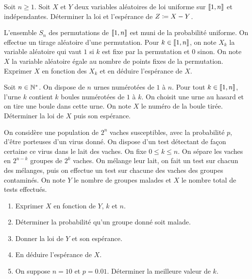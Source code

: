 \documentclass{magnolia}
\begin{document}


Soit $n \geq 1$. Soit $X$ et $Y$ deux variables aléatoires de loi uniforme sur $\left\llbracket 1,n\right\rrbracket$ et indépendantes.
Déterminer la loi et l'espérance de $Z\coloneqq X-Y$.

L'ensemble $S_n$ des permutations de $\left\llbracket 1,n\right\rrbracket$ est muni de la probabilité uniforme.
On effectue un tirage aléatoire d'une permutation. Pour $k \in \left\llbracket 1,n\right\rrbracket$, on note $X_k$ la variable aléatoire qui vaut $1$ si $k$ est fixe par la permutation et $0$ sinon.
On note $X$ la variable aléatoire égale au nombre de points fixes de la permutation.
Exprimer $X$ en fonction des $X_k$ et en déduire l'espérance de $X$.

Soit $n \in \mathbb{N} ^*$. On dispose de $n$ urnes numérotées de $1$ à $n$. Pour tout
$k\in\left\llbracket 1,n\right\rrbracket$, l'urne $k$ contient $k$ boules numérotées de $1$ à $k$. On choisit une
urne au hasard et on tire une boule dans cette urne. On note $X$ le numéro de la boule tirée.
Déterminer la loi de $X$ puis son espérance.

On considère une population de $2^n$ vaches susceptibles, avec la probabilité $p$, d'être porteuses d'un virus donné.
On dispose d'un test détectant de façon certaine ce virus dans le lait des vaches.
On fixe $0 \leq k \leq n$. On sépare les vaches en $2^{n-k}$ groupes de $2^k$ vaches. On mélange leur lait, on fait un test sur chacun des mélanges, puis on effectue un test sur chacune des vaches des groupes contaminés.
On note $Y$ le nombre de groupes malades et $X$ le nombre total de tests effectués.
\begin{enumerate}
\item Exprimer $X$ en fonction de $Y$, $k$ et $n$.
\item Déterminer la probabilité qu'un groupe donné soit malade.
\item Donner la loi de $Y$ et son espérance.
\item En déduire l'espérance de $X$.
\item On suppose $n=10$ et $p=0.01$. Déterminer la meilleure valeur de $k$.
\end{enumerate}
\end{document}

